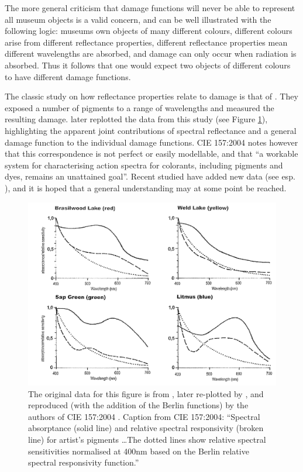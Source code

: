 The more general criticism that damage functions will never be able to represent all museum objects is a valid concern, and can be well illustrated with the following logic: museums own objects of many different colours, different colours arise from different reflectance properties, different reflectance properties mean different wavelengths are absorbed, and damage can only occur when radiation is absorbed. Thus it follows that one would expect two objects of different colours to have different damage functions. 

The classic study on how reflectance properties relate to damage is that of \citet{saunders_wavelength-dependent_1994}. They exposed a number of pigments to a range of wavelengths and measured the resulting damage.%
\citet{cuttle_control_1999} later replotted the data from this study (see Figure \ref{fig:Cuttle}), highlighting the apparent joint contributions of spectral reflectance and a general damage function to the individual damage functions. \gls{CIE} 157:2004 notes however that this correspondence is not perfect or easily modellable, and that ``a workable system for characterising action spectra for colorants, including pigments and dyes, remains an unattained goal''. Recent studied have added new data (see esp. \citet{villmann_wavelength_2018}), and it is hoped that a general understanding may at some point be reached.

\begin{figure}[htbp]
\includegraphics[max width=\textwidth]{figs/LitRev/Cuttle.png}
\caption{The original data for this figure is from \citet{saunders_wavelength-dependent_1994}, later re-plotted by \citet{cuttle_control_1999}, and reproduced (with the addition of the Berlin functions) by the authors of \gls{CIE} 157:2004 \citep{cie_cie_2004}. Caption from \gls{CIE} 157:2004: ``Spectral absorptance (solid line) and relative spectral responsivity (broken line) for artist's pigments \dots The dotted lines show relative spectral sensitivities normalised at 400nm based on the Berlin relative spectral responsivity function.''}
\label{fig:Cuttle}
\end{figure}

